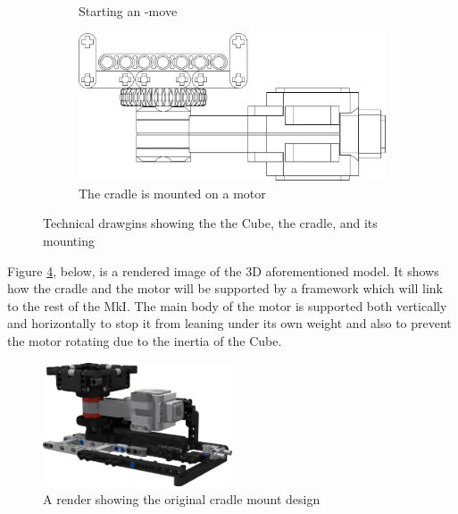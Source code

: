 \documentclass{report}
\newcommand{\move}[1]{\uppercase{\texttt{\formatmovesnospace{#1}}}-move}
\begin{document}
\begin{figure}[H]
\begin{subfigure}[b]{0.2\textwidth}
    		\caption{Starting an \move{x}}
    		\label{fig:dwgCradleCurvedEdgeTilted}
    	\end{subfigure}
	    \hspace{10mm}
	    \begin{subfigure}[b]{0.4\textwidth}
	    	\includegraphics[width=\textwidth]{Resources/Images/dwgCradleProfileV1.png}
	    	\caption{The cradle is mounted on a motor}
	    	\label{fig:dwgCradleProfileV1}
	    \end{subfigure}
    	\caption{Technical drawgins showing the the Cube, the cradle, and its mounting}
    	\label{fig:CradleDrawings}
    \end{figure}    
    
    Figure \ref{fig:rdrCradleMountedRotor}, below, is a rendered image of the 3D aforementioned model. It shows how the cradle and the motor will be supported by a framework which will link to the rest of the MkI. The main body of the motor is supported both vertically and horizontally to stop it from leaning under its own weight and also to prevent the motor rotating due to the inertia of the Cube.
    
    \begin{figure}[H]
    	\centering
   		\includegraphics[width=0.5\textwidth]{Resources/Images/rdrCradleMountedRotor.png}
   		\caption{A render showing the original cradle mount design}
   		\label{fig:rdrCradleMountedRotor}
    \end{figure}
    
\end{document}
